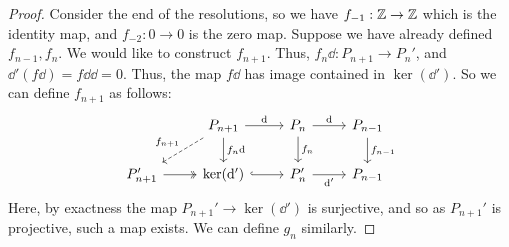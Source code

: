 \documentclass{article}
\begin{document}
\begin{proof}
    Consider the end of the resolutions, so we have
    \(f_{-1} : \mathbb{Z} \to \mathbb{Z}\)
    which is the identity map, and \(f_{-2} : 0 \to 0\) is the zero map. Suppose we have already defined \(f_{n-1}, f_n\). We would like to construct \(f_{n+1}\). Thus, \(f_n \dd : P_{n+1} \to P_n'\), and \(\dd'(f\dd) = f \dd \dd = 0\). Thus, the map \(f\dd\) has image contained in \(\ker(\dd')\). So we can define \(f_{n+1}\) as follows:
    \[\begin{tikzcd}
        & {P_{n+1}} & {P_n} & {P_{n-1}} \\
        {P_{n+1}'} & {\ker(\dd')} & {P_n'} & {P_{n-1}}
        \arrow["\dd", from=1-2, to=1-3]
        \arrow["\dd", from=1-3, to=1-4]
        \arrow["{f_n}", from=1-3, to=2-3]
        \arrow["{f_{n-1}}", from=1-4, to=2-4]
        \arrow["{\dd'}"', from=2-3, to=2-4]
        \arrow[hook, from=2-2, to=2-3]
        \arrow[two heads, from=2-1, to=2-2]
        \arrow["{f_n\dd}", from=1-2, to=2-2]
        \arrow["{f_{n+1}}"', dashed, from=1-2, to=2-1]
    \end{tikzcd}\]
    Here, by exactness the map \(P_{n+1}' \to \ker(\dd')\) is surjective, and so as \(P_{n+1}'\) is projective, such a map exists. We can define \(g_n\) similarly.


\end{proof}
\end{document}
